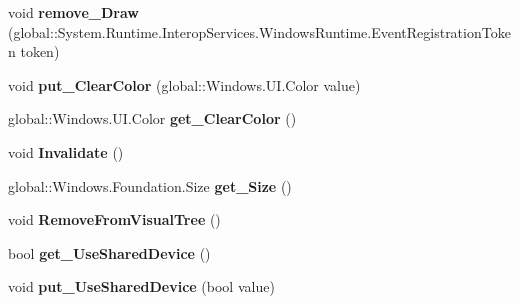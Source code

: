 \begin{DoxyCompactItemize}
void {\bfseries remove\+\_\+\+Draw} (global\+::\+System.\+Runtime.\+Interop\+Services.\+Windows\+Runtime.\+Event\+Registration\+Token token)
\item 
\mbox{\label{class_microsoft_1_1_graphics_1_1_canvas_1_1_u_i_1_1_xaml_1_1_canvas_control_ac45e4aa28ab4d2147741f75260781cfa}} 
void {\bfseries put\+\_\+\+Clear\+Color} (global\+::\+Windows.\+U\+I.\+Color value)
\item 
\mbox{\label{class_microsoft_1_1_graphics_1_1_canvas_1_1_u_i_1_1_xaml_1_1_canvas_control_ac1780376dd163f47f7d16e7470b4e96f}} 
global\+::\+Windows.\+U\+I.\+Color {\bfseries get\+\_\+\+Clear\+Color} ()
\item 
\mbox{\label{class_microsoft_1_1_graphics_1_1_canvas_1_1_u_i_1_1_xaml_1_1_canvas_control_a4676af3dd8e8a8a5bedabb4a172949db}} 
void {\bfseries Invalidate} ()
\item 
\mbox{\label{class_microsoft_1_1_graphics_1_1_canvas_1_1_u_i_1_1_xaml_1_1_canvas_control_a49e67369dc1fe3f019a64f6fdd0342cb}} 
global\+::\+Windows.\+Foundation.\+Size {\bfseries get\+\_\+\+Size} ()
\item 
\mbox{\label{class_microsoft_1_1_graphics_1_1_canvas_1_1_u_i_1_1_xaml_1_1_canvas_control_af9c6b8f3ff29e316e100e88d7589504e}} 
void {\bfseries Remove\+From\+Visual\+Tree} ()
\item 
\mbox{\label{class_microsoft_1_1_graphics_1_1_canvas_1_1_u_i_1_1_xaml_1_1_canvas_control_a60b81107044570bfbd0172ea06746e1a}} 
bool {\bfseries get\+\_\+\+Use\+Shared\+Device} ()
\item 
\mbox{\label{class_microsoft_1_1_graphics_1_1_canvas_1_1_u_i_1_1_xaml_1_1_canvas_control_afca7bdc3fc83df242ce81d1c39623cea}} 
void {\bfseries put\+\_\+\+Use\+Shared\+Device} (bool value)

\end{DoxyCompactItemize}
